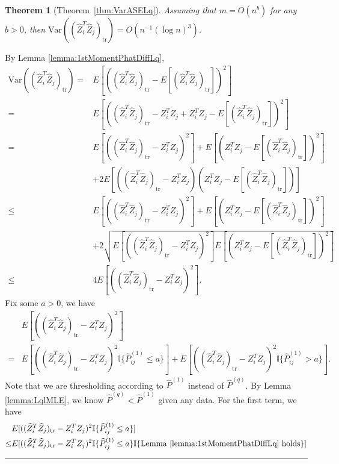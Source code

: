 \documentclass[a4paper]{article}
\newenvironment{proof}{{\bf Proof:  }}{\hfill\rule{2mm}{2mm}}
\newtheorem{theorem}[fact]{Theorem}
\renewcommand{\hat}{\widehat}
\begin{document}
\begin{theorem}[Theorem~\ref{thm:VarASELq}]
\label{thm:VarASELqproof}
Assuming that $m = O(n^b)$ for any $b > 0$, then $\mathrm{Var}((\hat{Z}_i^T \hat{Z}_j)_{\mathrm{tr}}) = O(n^{-1} (\log n)^3)$.
\end{theorem}
\begin{proof}
By Lemma \ref{lemma:1stMomentPhatDiffLq},
\begin{align*}
	\mathrm{Var}((\hat{Z}_i^T \hat{Z}_j)_{\mathrm{tr}})
    = & E[((\hat{Z}_i^T \hat{Z}_j)_{\mathrm{tr}} - E[(\hat{Z}_i^T \hat{Z}_j)_{\mathrm{tr}}])^2] \\
    = & E[((\hat{Z}_i^T \hat{Z}_j)_{\mathrm{tr}} - Z_i^T Z_j + Z_i^T Z_j - E[(\hat{Z}_i^T \hat{Z}_j)_{\mathrm{tr}}])^2] \\
    = & E[((\hat{Z}_i^T \hat{Z}_j)_{\mathrm{tr}} - Z_i^T Z_j)^2] + E[(Z_i^T Z_j - E[(\hat{Z}_i^T \hat{Z}_j)_{\mathrm{tr}}])^2] \\ 
    & + 2E[((\hat{Z}_i^T \hat{Z}_j)_{\mathrm{tr}} - Z_i^T Z_j)(Z_i^T Z_j - E[(\hat{Z}_i^T \hat{Z}_j)_{\mathrm{tr}}])] \\
    \le & E[((\hat{Z}_i^T \hat{Z}_j)_{\mathrm{tr}} - Z_i^T Z_j)^2] + E[(Z_i^T Z_j - E[(\hat{Z}_i^T \hat{Z}_j)_{\mathrm{tr}}])^2] \\ 
    & + 2\sqrt{E[((\hat{Z}_i^T \hat{Z}_j)_{\mathrm{tr}} - Z_i^T Z_j)^2] E[(Z_i^T Z_j - E[(\hat{Z}_i^T \hat{Z}_j)_{\mathrm{tr}}])^2]} \\
    \le & 4 E[((\hat{Z}_i^T \hat{Z}_j)_{\mathrm{tr}} - Z_i^T Z_j)^2].
\end{align*}
Fix some $a > 0$, we have
\begin{align*}
	& E[((\hat{Z}_i^T \hat{Z}_j)_{\mathrm{tr}} - Z_i^T Z_j)^2] \\
	= & E[((\hat{Z}_i^T \hat{Z}_j)_{\mathrm{tr}} - Z_i^T Z_j)^2 \mathbb{I}\{\hat{P}^{(1)}_{ij} \le a\}]
	+ E[((\hat{Z}_i^T \hat{Z}_j)_{\mathrm{tr}} - Z_i^T Z_j)^2 \mathbb{I}\{\hat{P}^{(1)}_{ij} > a\}].
\end{align*}
Note that we are thresholding according to $\hat{P}^{(1)}$ instead of $\hat{P}^{(q)}$. By Lemma \ref{lemma:LqlMLE}, we know $\hat{P}^{(q)} < \hat{P}^{(1)}$ given any data.
For the first term, we have
\begin{align*}
	& E[((\hat{Z}_i^T \hat{Z}_j)_{\mathrm{tr}} - Z_i^T Z_j)^2 \mathbb{I}\{\hat{P}^{(1)}_{ij} \le a\}] \\
	\le & E[((\hat{Z}_i^T \hat{Z}_j)_{\mathrm{tr}} - Z_i^T Z_j)^2 \mathbb{I}\{\hat{P}^{(1)}_{ij} \le a\} \mathbb{I}\{\mathrm{Lemma\ } \ref{lemma:1stMomentPhatDiffLq} \mathrm{\ holds}\}] \\

\end{align*}
\end{proof}
\end{document}
